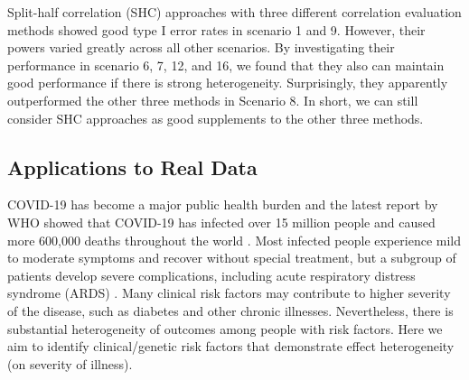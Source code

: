     Split-half correlation (SHC) approaches with three different correlation evaluation methods showed good type I error rates in scenario 1 and 9. However,  their powers varied greatly across all other scenarios. By investigating their performance in scenario 6, 7, 12, and 16, we found that they also can maintain good performance if there is strong heterogeneity. Surprisingly, they apparently outperformed the other three methods in Scenario 8. In short, we can still consider SHC approaches as good supplements to the other three methods.

  \subsection{Applications to Real Data}
    COVID-19 has become a major public health burden and the latest report by WHO showed that COVID-19 has infected over 15 million  people and caused more 600,000 deaths throughout the world \cite{dong2020interactive}. Most infected people experience mild to moderate symptoms and recover without special treatment, but a subgroup of patients develop severe complications, including acute respiratory distress syndrome (ARDS) \cite{ellinghaus2020genomewide}.  Many clinical risk factors may contribute to higher severity of the disease, such as diabetes and other chronic illnesses. Nevertheless, there is substantial heterogeneity of outcomes among people with risk factors.  Here we aim to identify clinical/genetic risk factors that demonstrate effect heterogeneity (on severity of illness). 

